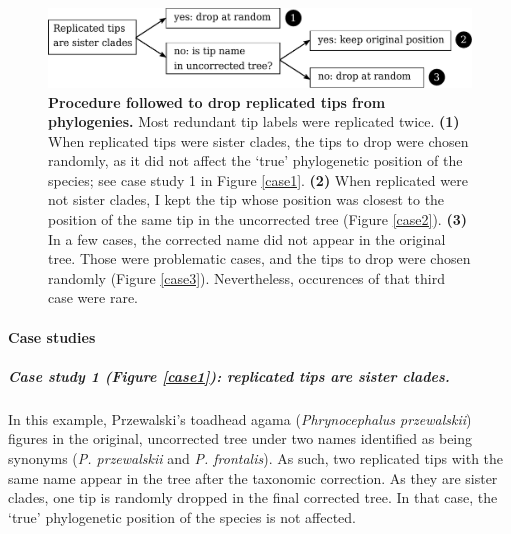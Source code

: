 \documentclass[11pt]{article}
\begin{document}
\begin{figure}[h!]
\centering
\includegraphics[scale=0.7]{figures/chart_phylorep}
\caption[Procedure followed to drop replicated tips from phylogenies]{\textbf{Procedure followed to drop replicated tips from phylogenies.} Most redundant tip labels were replicated twice. \textbf{(1)} When replicated tips were sister clades, the tips to drop were chosen randomly, as it did not affect the `true' phylogenetic position of the species; see case study 1 in Figure \ref{case1}. \textbf{(2)} When replicated were not sister clades, I kept the tip whose position was closest to the position of the same tip in the uncorrected tree (Figure \ref{case2}). \textbf{(3)} In a few cases, the corrected name did not appear in the original tree. Those were problematic cases, and the tips to drop were chosen randomly (Figure \ref{case3}). Nevertheless, occurences of that third case were rare.}
\label{chart_phylorep}
\end{figure}


\newpage
\paragraph{Case studies}

\subparagraph{Case study 1 (Figure \ref{case1}): replicated tips are sister clades.} In this example, Przewalski's toadhead agama (\textit{Phrynocephalus przewalskii}) figures in the original, uncorrected tree under two names identified as being synonyms (\textit{P. przewalskii} and \textit{P. frontalis}). As such, two replicated tips with the same name appear in the tree after the taxonomic correction. As they are sister clades, one tip is randomly dropped in the final corrected tree. In that case, the `true' phylogenetic position of the species is not affected.
\end{document}
